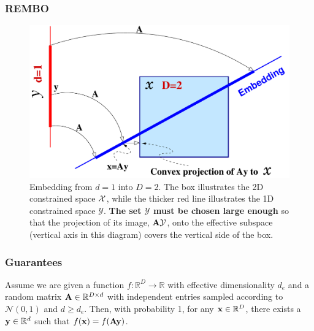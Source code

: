 \documentclass[grey]{beamer}
\begin{document}
 \begin{frame}
 \frametitle{REMBO}
  \begin{figure}[t!]
\centering
  \includegraphics[scale=0.28]{../paper/figures/projection.pdf}
  \caption{Embedding from $d=1$ into $D=2$. The box illustrates the 2D constrained space ${\cal X}$, while the thicker red line illustrates the 1D constrained space $\mathcal{Y}$. {\bf \textcolor{myColor}{The set $\mathcal{Y}$ must be chosen large enough}} so that the projection of its image, $\mathbf{A} \mathcal{Y}$, onto the effective subspace (vertical axis in this diagram) covers the vertical side of the box.}
  \label{fig:proj}
  \vspace{-1em}
\end{figure}
 \end{frame}
 
 \begin{frame}
  \frametitle{Guarantees}
  \begin{theorem}
   \label{prop:1}
   Assume we are given a function $f: \mathbb{R}^{D} \rightarrow \mathbb{R}$ with effective dimensionality $d_e$ and a random matrix $\mathbf{A} \in \mathbb{R}^{D\times d}$ with independent entries sampled according to $\mathcal{N}(0, 1)$ and $d\geq d_e$. Then, with probability 1, for any $\mathbf{x} \in \mathbb{R}^D$, there exists a $ \mathbf{y} \in \mathbb{R}^d$ such that $f(\mathbf{x}) = f(\mathbf{A}\mathbf{y})$.
  \end{theorem}
 \end{frame}
 
\end{document}
